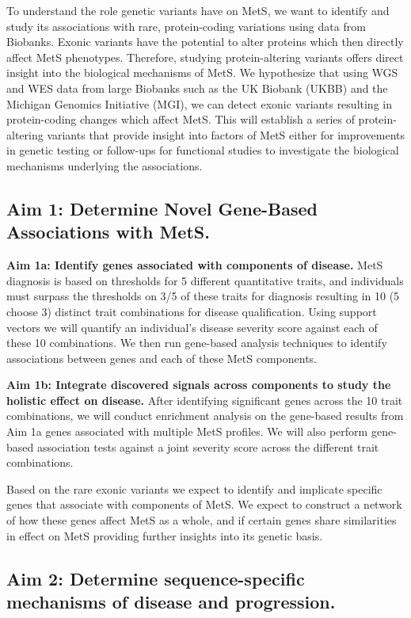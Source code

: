 \documentclass[11pt]{article}
\begin{document}
To understand the role genetic variants have on MetS, we want to identify and study its associations with rare, protein-coding variations using data from Biobanks. Exonic variants have the potential to alter proteins which then directly affect MetS phenotypes. Therefore, studying protein-altering variants offers direct insight into the biological mechanisms of MetS. We hypothesize that using WGS and WES data from large Biobanks such as the UK Biobank (UKBB) and the Michigan Genomics Initiative (MGI), we can detect exonic variants resulting in protein-coding changes which affect MetS. This will establish a series of protein-altering variants that provide insight into factors of MetS either for improvements in genetic testing or follow-ups for functional studies to investigate the biological mechanisms underlying the associations.

\subsection*{Aim 1: Determine Novel Gene-Based Associations with MetS.}

\textbf{Aim 1a: Identify genes associated with components of disease.} MetS diagnosis is based on thresholds for 5 different quantitative traits, and individuals must surpass the thresholds on 3/5 of these traits for diagnosis resulting in 10 (5 choose 3) distinct trait combinations for disease qualification. Using support vectors we will quantify an individual's disease severity score against each of these 10 combinations. We then run gene-based analysis techniques to identify associations between genes and each of these MetS components. 

\textbf{Aim 1b: Integrate discovered signals across components to study the holistic effect on disease.} After identifying significant genes across the 10 trait combinations, we will conduct enrichment analysis on the gene-based results from Aim 1a genes associated with multiple MetS profiles. We will also perform gene-based association tests against a joint severity score across the different trait combinations. 

Based on the rare exonic variants we expect to identify and implicate specific genes that associate with components of MetS. We expect to construct a network of how these genes affect MetS as a whole, and if certain genes share similarities in effect on MetS providing further insights into its genetic basis.

\subsection*{Aim 2: Determine sequence-specific mechanisms of disease and progression.}
\end{document}
